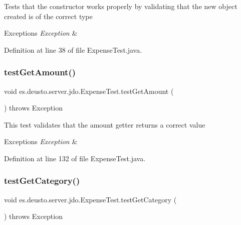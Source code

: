 Tests that the constructor works properly by validating that the new object created is of the correct type


\begin{DoxyExceptions}{Exceptions}
{\em Exception} & \\
\hline
\end{DoxyExceptions}


Definition at line 38 of file Expense\+Test.\+java.

\mbox{\label{classes_1_1deusto_1_1server_1_1jdo_1_1_expense_test_a18a3c76cb6200e9cbeb2f88a41f7a39c}} 
\subsubsection{\texorpdfstring{test\+Get\+Amount()}{testGetAmount()}}
{\footnotesize\ttfamily void es.\+deusto.\+server.\+jdo.\+Expense\+Test.\+test\+Get\+Amount (\begin{DoxyParamCaption}{ }\end{DoxyParamCaption}) throws Exception}

This test validates that the amount getter returns a correct value 
\begin{DoxyExceptions}{Exceptions}
{\em Exception} & \\
\hline
\end{DoxyExceptions}


Definition at line 132 of file Expense\+Test.\+java.

\mbox{\label{classes_1_1deusto_1_1server_1_1jdo_1_1_expense_test_a137a49175ad33ab63b53a6c4d1fc56ae}} 
\subsubsection{\texorpdfstring{test\+Get\+Category()}{testGetCategory()}}
{\footnotesize\ttfamily void es.\+deusto.\+server.\+jdo.\+Expense\+Test.\+test\+Get\+Category (\begin{DoxyParamCaption}{ }\end{DoxyParamCaption}) throws Exception}

